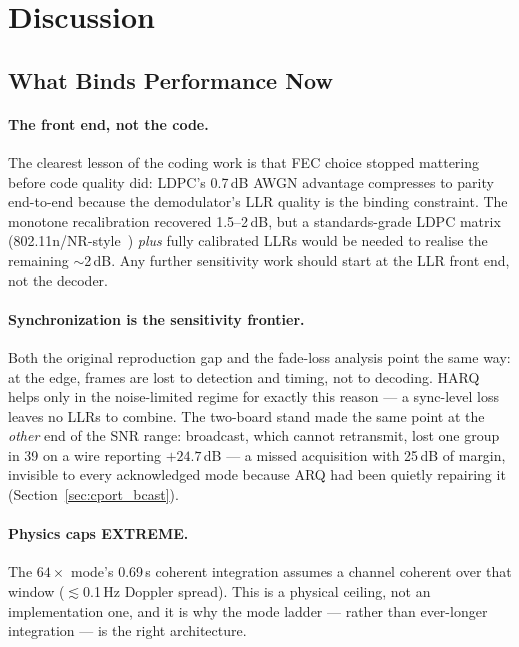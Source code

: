 \section{Discussion}
\label{sec:discussion}

\subsection{What Binds Performance Now}

\paragraph{The front end, not the code.}  The clearest lesson of the
coding work is that FEC choice stopped mattering before code quality
did: LDPC's 0.7\,dB AWGN advantage compresses to parity end-to-end
because the demodulator's LLR quality is the binding constraint.  The
monotone recalibration recovered 1.5--2\,dB, but a standards-grade
LDPC matrix (802.11n/NR-style~\cite{ieee80211}) \emph{plus} fully
calibrated LLRs would be needed to realise the remaining
$\sim$2\,dB.  Any further sensitivity work should start at the LLR
front end, not the decoder.

\paragraph{Synchronization is the sensitivity frontier.}  Both the
original reproduction gap and the fade-loss analysis point the same
way: at the edge, frames are lost to detection and timing, not to
decoding.  HARQ helps only in the noise-limited regime for exactly
this reason --- a sync-level loss leaves no LLRs to combine.  The
two-board stand made the same point at the \emph{other} end of the
SNR range: broadcast, which cannot retransmit, lost one group in 39 on
a wire reporting $+24.7$\,dB --- a missed acquisition with 25\,dB of
margin, invisible to every acknowledged mode because ARQ had been
quietly repairing it (Section~\ref{sec:cport_bcast}).

\paragraph{Physics caps EXTREME.}  The $64\times$ mode's 0.69\,s
coherent integration assumes a channel coherent over that window
($\lesssim$0.1\,Hz Doppler spread).  This is a physical ceiling, not
an implementation one, and it is why the mode ladder --- rather than
ever-longer integration --- is the right architecture.

